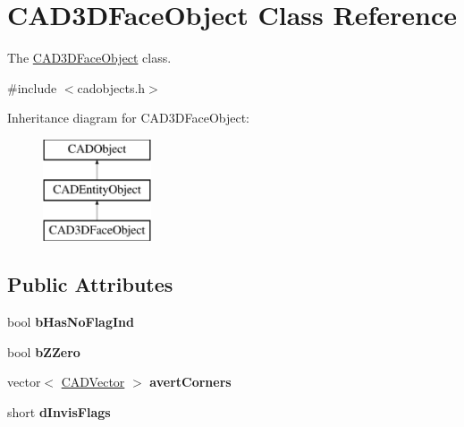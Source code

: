 \hypertarget{class_c_a_d3_d_face_object}{}\section{C\+A\+D3\+D\+Face\+Object Class Reference}
\label{class_c_a_d3_d_face_object}


The \hyperlink{class_c_a_d3_d_face_object}{C\+A\+D3\+D\+Face\+Object} class.  




{\ttfamily \#include $<$cadobjects.\+h$>$}

Inheritance diagram for C\+A\+D3\+D\+Face\+Object\+:\begin{figure}[H]
\begin{center}
\leavevmode
\includegraphics[height=3.000000cm]{class_c_a_d3_d_face_object}
\end{center}
\end{figure}
\subsection*{Public Attributes}
\begin{DoxyCompactItemize}
\item 
bool {\bfseries b\+Has\+No\+Flag\+Ind}\hypertarget{class_c_a_d3_d_face_object_a79dca7ebb3937339dd1161bec6b5cd6b}{}\label{class_c_a_d3_d_face_object_a79dca7ebb3937339dd1161bec6b5cd6b}

\item 
bool {\bfseries b\+Z\+Zero}\hypertarget{class_c_a_d3_d_face_object_ad706e41e727e93ed86942ee5fc1bf191}{}\label{class_c_a_d3_d_face_object_ad706e41e727e93ed86942ee5fc1bf191}

\item 
vector$<$ \hyperlink{class_c_a_d_vector}{C\+A\+D\+Vector} $>$ {\bfseries avert\+Corners}\hypertarget{class_c_a_d3_d_face_object_aeeb82558b3aa77c799f102f5458c865c}{}\label{class_c_a_d3_d_face_object_aeeb82558b3aa77c799f102f5458c865c}

\item 
short {\bfseries d\+Invis\+Flags}\hypertarget{class_c_a_d3_d_face_object_a7b9b1f287c9a57e0cda28d1d3710875c}{}\label{class_c_a_d3_d_face_object_a7b9b1f287c9a57e0cda28d1d3710875c}

\end{DoxyCompactItemize}
